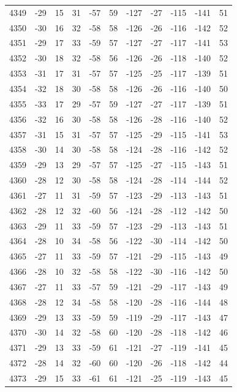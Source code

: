 \begin{table}[H]
\begin{tabular}{lllllllllll}
4349 & -29 & 15 & 31 & -57 & 59 & -127 & -27 & -115 & -141 & 51 \\
4350 & -30 & 16 & 32 & -58 & 58 & -126 & -26 & -116 & -142 & 52 \\
4351 & -29 & 17 & 33 & -59 & 57 & -127 & -27 & -117 & -141 & 53 \\
4352 & -30 & 18 & 32 & -58 & 56 & -126 & -26 & -118 & -140 & 52 \\
4353 & -31 & 17 & 31 & -57 & 57 & -125 & -25 & -117 & -139 & 51 \\
4354 & -32 & 18 & 30 & -58 & 58 & -126 & -26 & -116 & -140 & 50 \\
4355 & -33 & 17 & 29 & -57 & 59 & -127 & -27 & -117 & -139 & 51 \\
4356 & -32 & 16 & 30 & -58 & 58 & -126 & -28 & -116 & -140 & 52 \\
4357 & -31 & 15 & 31 & -57 & 57 & -125 & -29 & -115 & -141 & 53 \\
4358 & -30 & 14 & 30 & -58 & 58 & -124 & -28 & -116 & -142 & 52 \\
4359 & -29 & 13 & 29 & -57 & 57 & -125 & -27 & -115 & -143 & 51 \\
4360 & -28 & 12 & 30 & -58 & 58 & -124 & -28 & -114 & -144 & 52 \\
4361 & -27 & 11 & 31 & -59 & 57 & -123 & -29 & -113 & -143 & 51 \\
4362 & -28 & 12 & 32 & -60 & 56 & -124 & -28 & -112 & -142 & 50 \\
4363 & -29 & 11 & 33 & -59 & 57 & -123 & -29 & -113 & -143 & 51 \\
4364 & -28 & 10 & 34 & -58 & 56 & -122 & -30 & -114 & -142 & 50 \\
4365 & -27 & 11 & 33 & -59 & 57 & -121 & -29 & -115 & -143 & 49 \\
4366 & -28 & 10 & 32 & -58 & 58 & -122 & -30 & -116 & -142 & 50 \\
4367 & -27 & 11 & 33 & -57 & 59 & -121 & -29 & -117 & -143 & 49 \\
4368 & -28 & 12 & 34 & -58 & 58 & -120 & -28 & -116 & -144 & 48 \\
4369 & -29 & 13 & 33 & -59 & 59 & -119 & -29 & -117 & -143 & 47 \\
4370 & -30 & 14 & 32 & -58 & 60 & -120 & -28 & -118 & -142 & 46 \\
4371 & -29 & 13 & 33 & -59 & 61 & -121 & -27 & -119 & -141 & 45 \\
4372 & -28 & 14 & 32 & -60 & 60 & -120 & -26 & -118 & -142 & 44 \\
4373 & -29 & 15 & 33 & -61 & 61 & -121 & -25 & -119 & -143 & 45 \\

\end{tabular}
\end{table}
